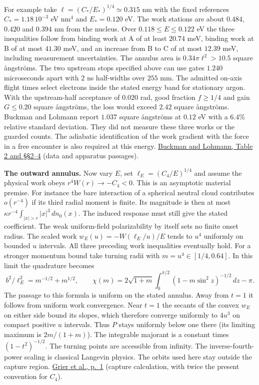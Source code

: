 \documentclass[11pt,a4paper]{article}
\begin{document}
For example take \(\ell=(C_*/E_*)^{1/4}\simeq0.315\) nm with the fixed
references \(C_*=1.18\,10^{-3}\) eV nm\(^4\) and \(E_*=0.120\) eV. The
work stations are about \(0.484\), \(0.420\) and \(0.394\) nm from the
nucleus. Over \(0.118\le E\le0.122\) eV the three inequalities follow
from binding work at A of at least \(20.74\) meV, binding work at B of
at most \(41.30\) meV, and an increase from B to C of at most \(12.39\)
meV, including measurement uncertainties. The annulus area is
\(0.34\pi\ell^2>10.5\) square ångströms. The two upstream stops
specified above can use gates \(1.240\) microseconds apart with \(2\) ns
half-widths over \(255\) mm. The admitted on-axis flight times select
electrons inside the stated energy band for stationary argon. With the
upstream-half acceptance of \(0.020\) rad, good fraction \(f\ge1/4\) and
gain \(G\le0.20\) square ångströms, the loss would exceed \(2.42\)
square ångströms. Buckman and Lohmann report \(1.037\) square ångströms
at \(0.12\) eV with a \(6.4\%\) relative standard deviation. They did
not measure these three works or the guarded counts. The adiabatic
identification of the work gradient with the force in a free encounter
is also required at this energy.
\href{https://doi.org/10.1088/0022-3700/19/16/013}{Buckman and Lohmann,
Table 2 and §§2--4} (data and apparatus passages).

\textbf{The outward annulus.} Now vary \(E\), set
\(\ell_E=(C_4/E)^{1/4}\) and assume the physical work obeys
\(r^4W(r)\to-C_4<0\). This is an asymptotic material premise. For
instance the bare interaction of a spherical neutral cloud contributes
\(o(r^{-4})\) if its third radial moment is finite. Its magnitude is
then at most \(\kappa r^{-4}\int_{|x|>r}|x|^3\,dn_0(x)\). The induced
response must still give the stated coefficient. The weak uniform-field
polarizability by itself sets no finite onset radius. The scaled work
\(w_E(u)=-W(\ell_E/u)/E\) tends to \(u^4\) uniformly on bounded \(u\)
intervals. All three preceding work inequalities eventually hold. For a
stronger momentum bound take turning radii with \(m=u^4\in[1/4,0.64]\).
In this limit the quadrature becomes \[
 b^2/\ell_E^2=m^{-1/2}+m^{1/2},\qquad
 \chi(m)=2\sqrt{1+m}\int_0^{\pi/2}(1-m\sin^2 z)^{-1/2}\,dz-\pi .
\] The passage to this formula is uniform on the stated annulus. Away
from \(t=1\) it follows from uniform work convergence. Near \(t=1\) the
secants of the convex \(w_E\) on either side bound its slopes, which
therefore converge uniformly to \(4u^3\) on compact positive \(u\)
intervals. Thus \(P\) stays uniformly below one there (its limiting
maximum is \(2m/(1+m)\)). The integrable majorant is a constant times
\((1-t^2)^{-1/2}\). The turning points are accessible from infinity. The
inverse-fourth-power scaling is classical Langevin physics. The orbits
used here stay outside the capture region.
\href{https://arxiv.org/pdf/0808.3620}{Grier et al., p.~1} (capture
calculation, with twice the present convention for \(C_4\)).
\end{document}
